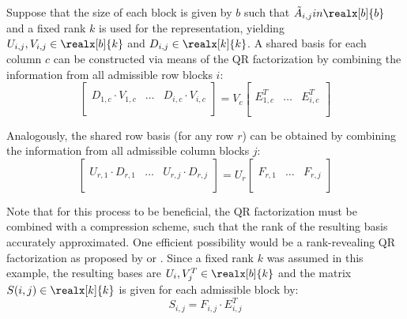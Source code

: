 \noindent Suppose that the size of each block is given by $b$ such that $\Tilde{A}_{i,j} in \realx[b]{b}$ and a fixed rank $k$ is used for the representation, yielding $U_{i,j}, V_{i,j} \in \realx[b]{k}$ and $D_{i,j} \in \realx[k]{k}$. A shared basis for each column $c$ can be constructed via means of the QR factorization by combining the information from all admissible row blocks $i$:
\begin{equation}
  \left[
    \begin{array}{c|c|c}
      & & \\
      D_{1,c}\cdot V_{1,c} &\dots & D_{i,c}\cdot V_{i,c} \\
      & & \\
    \end{array}
  \right] = V_c
  \left[
    \begin{array}{c|c|c}
      & & \\
      E_{1,c}^T &\dots & E_{i,c}^T \\
      & & \\
    \end{array}
  \right]
\end{equation}

\noindent Analogously, the shared row basis (for any row $r$) can be obtained by combining the information from all admissible column blocks $j$:
\begin{equation}
  \left[
    \begin{array}{c|c|c}
      & & \\
      U_{r,1}\cdot D_{r,1} &\dots & U_{r,j}\cdot D_{r,j} \\
      & & \\
    \end{array}
  \right] = U_r
  \left[
    \begin{array}{c|c|c}
      & & \\
     F_{r,1} &\dots & F_{r,j} \\
      & & \\
    \end{array}
  \right]
\end{equation}

\noindent Note that for this process to be beneficial, the QR factorization must be combined with a compression scheme, such that the rank of the resulting basis accurately approximated. One efficient possibility would be a rank-revealing QR factorization as proposed by \cite{hong_rank-revealing_1992} or \cite{gu_efficient_1996}. Since a fixed rank $k$ was assumed in this example, the resulting bases are $U_{i}, V^T_{j} \in \realx[b]{k}$ and the matrix $S(i,j) \in \realx[k]{k}$ is given for each admissible block by:
\begin{equation}
    S_{i,j}=F_{i,j} \cdot E_{i,j}^T
\end{equation}

